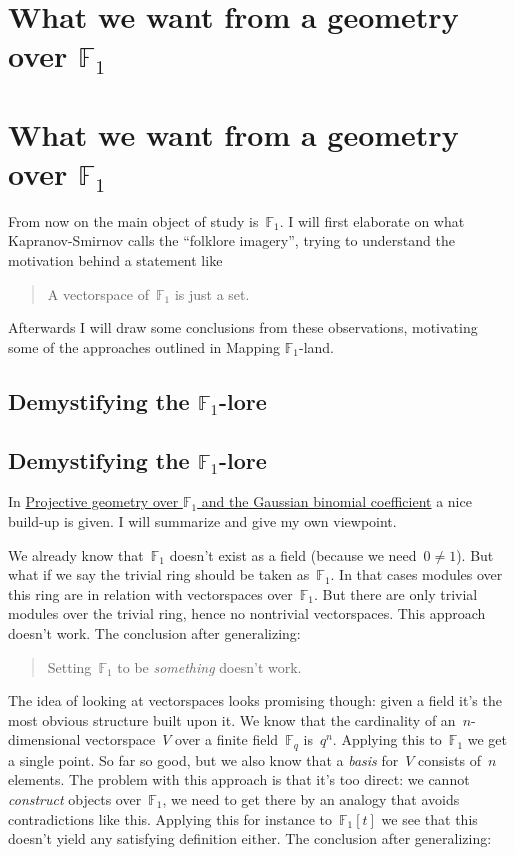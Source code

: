 \iftex
\section{What we want from a geometry over \texorpdfstring{$\mathbb{F}_1$}{F\_1}}
\fi
\ifblog
\section{What we want from a geometry over $\mathbb{F}_1$}
\fi

From now on the main object of study is~$\mathbb{F}_1$. I will first elaborate on what Kapranov-Smirnov calls the ``folklore imagery'', trying to understand the motivation behind a statement like

\begin{quote}
  A vectorspace of~$\mathbb{F}_1$ is just a set.
\end{quote}

Afterwards I will draw some conclusions from these observations, motivating some of the approaches outlined in \iftex\cite{mapping-fun}\fi\ifblog Mapping $\mathbb{F}_1$-land\fi.


\iftex
\subsection{Demystifying the \texorpdfstring{$\mathbb{F}_1$}{F\_1}-lore}
\fi
\ifblog
\subsection{Demystifying the $\mathbb{F}_1$-lore}
\fi
In \iftex \cite{projective-geometry-over-f1} \fi\ifblog \href{http://arxiv.org/abs/math/0407093}{Projective geometry over $\mathbb{F}_1$ and the Gaussian binomial coefficient} \fi a nice build-up is given. I will summarize and give my own viewpoint.

We already know that~$\mathbb{F}_1$ doesn't exist as a field (because we need~$0\neq 1$). But what if we say the trivial ring should be taken as~$\mathbb{F}_1$. In that cases modules over this ring are in relation with vectorspaces over~$\mathbb{F}_1$. But there are only trivial modules over the trivial ring, hence no nontrivial vectorspaces. This approach doesn't work. The conclusion after generalizing:

\begin{quote}
  Setting~$\mathbb{F}_1$ to be \emph{something} doesn't work.
\end{quote}

The idea of looking at vectorspaces looks promising though: given a field it's the most obvious structure built upon it. We know that the cardinality of an~$n$\nobreakdash-dim\-ensional vectorspace~$V$ over a finite field~$\mathbb{F}_q$ is~$q^n$. Applying this to~$\mathbb{F}_1$ we get a single point. So far so good, but we also know that a \emph{basis} for~$V$ consists of~$n$ elements. The problem with this approach is that it's too direct: we cannot \emph{construct} objects over~$\mathbb{F}_1$, we need to get there by an analogy that avoids contradictions like this. Applying this for instance to~$\mathbb{F}_1[t]$ we see that this doesn't yield any satisfying definition either. The conclusion after generalizing:

